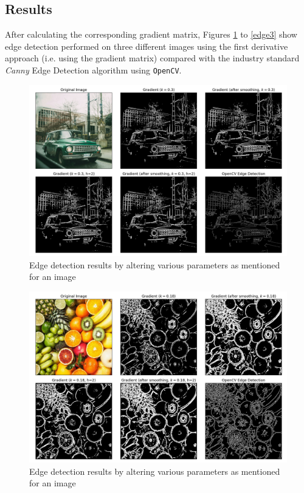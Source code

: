 \subsection{Results}
After calculating the corresponding gradient matrix, 
Figures \ref{edge1} to \ref{edge3} show edge detection performed on three different images using the first derivative approach (i.e. using the gradient matrix) compared with the industry standard \textit{Canny} Edge Detection algorithm using \verb|OpenCV|.

\begin{figure}[H]
    \centering
    \includegraphics[width=1\linewidth]{Figures/1/cara.png}
    \caption{Edge detection results by altering various parameters as mentioned for an image}
    \label{edge1}
\end{figure}

\begin{figure}[H]
    \centering
    \includegraphics[width=1\linewidth]{Figures/1/fruits.jpg}
    \caption{Edge detection results by altering various parameters as mentioned for an image}
\end{figure}

